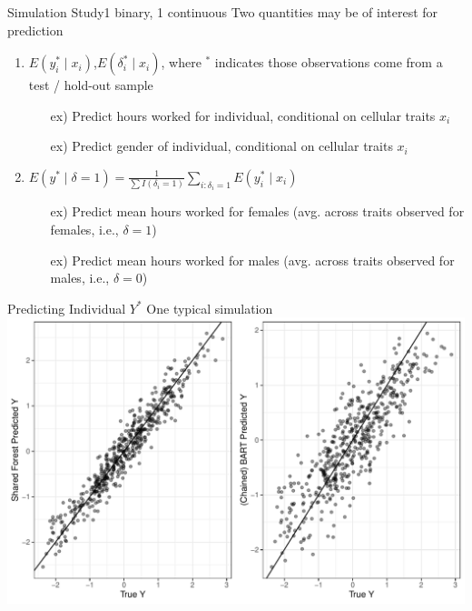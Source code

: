 \documentclass{beamer}
\begin{document}
\begin{frame}{Simulation Study}{1 binary, 1 continuous }
Two quantities may be of interest for prediction
\begin{enumerate}
\item $E( y_i^* \mid x_i)$,$E(\delta_i^* \mid x_i)$, where $^*$ indicates those observations come from a test / hold-out sample
  \begin{itemize}
    \item[ex)] Predict hours worked for individual, conditional on cellular traits $x_i$
    \item[ex)] Predict gender of individual, conditional on cellular traits $x_i$
  \end{itemize}
\item $E(y^* \mid \delta = 1) = \frac{1}{\sum I(\delta_i = 1)}\sum_{i: \delta_i = 1}E(y_i^* \mid x_i)$
  \begin{itemize}
    \item[ex)] Predict mean hours worked for females (avg. across traits observed for females, i.e., $\delta = 1$)
    \item[ex)] Predict mean hours worked for males (avg. across traits observed for males, i.e., $\delta = 0$)
  \end{itemize}
\end{enumerate}
\end{frame}


\begin{frame}{Predicting Individual $Y^*$ }{One typical simulation}
\includegraphics[width = .9\linewidth]{continuous_sim_results_single_sim.pdf}
\end{frame}
\end{document}
